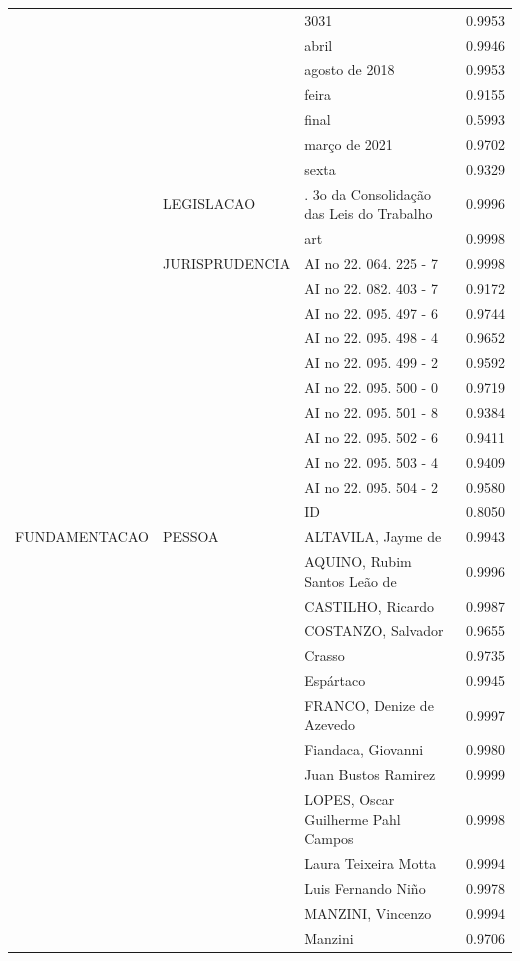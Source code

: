 \begin{table}
\begin{tabular}{llp{6cm}r}
 &  & 3031 & 0.9953 \\
 &  & abril & 0.9946 \\
 &  & agosto de 2018 & 0.9953 \\
 &  & feira & 0.9155 \\
 &  & final & 0.5993 \\
 &  & março de 2021 & 0.9702 \\
 &  & sexta & 0.9329 \\
 & LEGISLACAO & . 3o da Consolidação das Leis do Trabalho & 0.9996 \\
 &  & art & 0.9998 \\
 & JURISPRUDENCIA & AI no 22. 064. 225 - 7 & 0.9998 \\
 &  & AI no 22. 082. 403 - 7 & 0.9172 \\
 &  & AI no 22. 095. 497 - 6 & 0.9744 \\
 &  & AI no 22. 095. 498 - 4 & 0.9652 \\
 &  & AI no 22. 095. 499 - 2 & 0.9592 \\
 &  & AI no 22. 095. 500 - 0 & 0.9719 \\
 &  & AI no 22. 095. 501 - 8 & 0.9384 \\
 &  & AI no 22. 095. 502 - 6 & 0.9411 \\
 &  & AI no 22. 095. 503 - 4 & 0.9409 \\
 &  & AI no 22. 095. 504 - 2 & 0.9580 \\
 &  & ID & 0.8050 \\
FUNDAMENTACAO & PESSOA & ALTAVILA, Jayme de & 0.9943 \\
 &  & AQUINO, Rubim Santos Leão de & 0.9996 \\
 &  & CASTILHO, Ricardo & 0.9987 \\
 &  & COSTANZO, Salvador & 0.9655 \\
 &  & Crasso & 0.9735 \\
 &  & Espártaco & 0.9945 \\
 &  & FRANCO, Denize de Azevedo & 0.9997 \\
 &  & Fiandaca, Giovanni & 0.9980 \\
 &  & Juan Bustos Ramirez & 0.9999 \\
 &  & LOPES, Oscar Guilherme Pahl Campos & 0.9998 \\
 &  & Laura Teixeira Motta & 0.9994 \\
 &  & Luis Fernando Niño & 0.9978 \\
 &  & MANZINI, Vincenzo & 0.9994 \\
 &  & Manzini & 0.9706 \\

\end{tabular}
\end{table}
